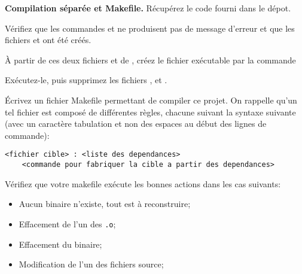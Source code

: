 \documentclass[10pt]{article}\usepackage[nu]{esial}
\begin{document}
\Exercice\textbf{Compilation séparée et Makefile.}
Récupérez le code fourni dans le dépot.


\Question Vérifiez que les commandes  et  ne produisent pas de message d'erreur et que les fichiers
 et  ont été créés.

\Question À partir de ces deux fichiers et de , créez le fichier
exécutable  par la commande 

\Question Exécutez-le, puis supprimez les fichiers ,
 et .


\Question Écrivez un fichier Makefile permettant de compiler ce projet. On
rappelle qu'un tel fichier est composé de différentes règles, chacune suivant
la syntaxe suivante (avec un caractère tabulation et non des espaces au début
des lignes de commande):
\begin{Verbatim}
<fichier cible> : <liste des dependances>
	<commande pour fabriquer la cible a partir des dependances>  
\end{Verbatim}

\Question Vérifiez que votre makefile exécute les bonnes actions dans les cas
suivants:
\begin{itemize}
\item Aucun binaire n'existe, tout est à reconstruire;
\item Effacement de l'un des \texttt{.o};
\item Effacement du binaire;
\item Modification de l'un des fichiers source;
\end{itemize}
\end{document}
